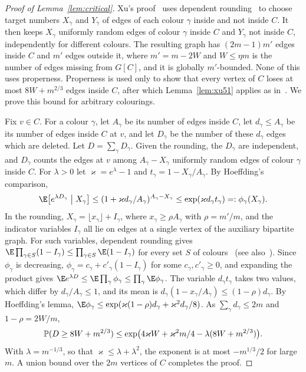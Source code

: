 \begin{proof}[Proof of Lemma~\ref{lem:critical}]
Xu's proof~\cite[Lemma~5.2]{Xu} uses dependent rounding~\cite{GKPS} to choose target numbers $X_\gamma$ and $Y_\gamma$ of edges of each colour $\gamma$ inside and not inside $C$. It then keeps $X_\gamma$ uniformly random edges of colour $\gamma$ inside $C$ and $Y_\gamma$ not inside $C$, independently for different colours.
The resulting graph has $(2m-1)m'$ edges inside $C$ and $m'$ edges outside it, where $m'=m-2W$ and $W\le\eta m$ is the number of edges missing from $G[C]$, and it is globally $m'$-bounded.
None of this uses properness.
Properness is used only to show that every vertex of $C$ loses at most $8W+m^{2/3}$ edges inside $C$, after which Lemma~\ref{lem:xu51} applies as in~\cite{Xu}.
We prove this bound for arbitrary colourings.

Fix $v\in C$. For a colour $\gamma$, let $A_\gamma$ be its number of edges inside $C$, let $d_\gamma\le A_\gamma$ be its number of edges inside $C$ at $v$, and let $D_\gamma$ be the number of these $d_\gamma$ edges which are deleted. Let $D=\sum_\gamma D_\gamma$.
Given the rounding, the $D_\gamma$ are independent, and $D_\gamma$ counts the edges at $v$ among $A_\gamma-X_\gamma$ uniformly random edges of colour $\gamma$ inside $C$.
For $\lambda>0$ let $\varkappa=e^\lambda-1$ and $t_\gamma=1-X_\gamma/A_\gamma$. By Hoeffding's comparison,
\[
\E\bigl[e^{\lambda D_\gamma}\bigm|X_\gamma\bigr]\le(1+\varkappa d_\gamma/A_\gamma)^{A_\gamma-X_\gamma}\le\exp(\varkappa d_\gamma t_\gamma)=:\phi_\gamma(X_\gamma).
\]
In the rounding, $X_\gamma=\lfloor x_\gamma\rfloor+I_\gamma$, where $x_\gamma\ge\rho A_\gamma$ with $\rho=m'/m$, and the indicator variables $I_\gamma$ all lie on edges at a single vertex of the auxiliary bipartite graph. For such variables, dependent rounding gives $\E\prod_{\gamma\in S}(1-I_\gamma)\le\prod_{\gamma\in S}\E(1-I_\gamma)$ for every set $S$ of colours~\cite{GKPS} (see also~\cite[Section~1]{CVZ}).
Since $\phi_\gamma$ is decreasing, $\phi_\gamma=c_\gamma+c'_\gamma(1-I_\gamma)$ for some $c_\gamma,c'_\gamma\ge0$, and expanding the product gives $\E e^{\lambda D}\le\E\prod_\gamma\phi_\gamma\le\prod_\gamma\E\phi_\gamma$.
The variable $d_\gamma t_\gamma$ takes two values, which differ by $d_\gamma/A_\gamma\le1$, and its mean is $d_\gamma(1-x_\gamma/A_\gamma)\le(1-\rho)d_\gamma$. By Hoeffding's lemma, $\E\phi_\gamma\le\exp(\varkappa(1-\rho)d_\gamma+\varkappa^2d_\gamma/8)$.
As $\sum_\gamma d_\gamma\le2m$ and $1-\rho=2W/m$,
\[
\mathbb{P}(D\ge8W+m^{2/3})\le\exp\bigl(4\varkappa W+\varkappa^2m/4-\lambda(8W+m^{2/3})\bigr).
\]
With $\lambda=m^{-1/3}$, so that $\varkappa\le\lambda+\lambda^2$, the exponent is at most $-m^{1/3}/2$ for large $m$. A union bound over the $2m$ vertices of $C$ completes the proof.
\end{proof}

